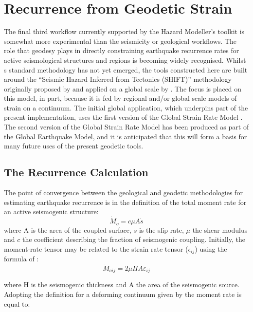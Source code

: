 \section{Recurrence from Geodetic Strain}

The final third workflow currently supported by the Hazard Modeller's toolkit is somewhat more experimental than the seismicity or geological workflows. The role that geodesy plays in directly constraining earthquake recurrence rates for active seismological structures and regions is becoming widely recognised. Whilst s standard methodology has not yet emerged, the tools constructed here are built around the ``Seismic Hazard Inferred from Tectonics (SHIFT)'' methodology originally proposed by \textcite{BirdLiu2007} and applied on a global scale by \textcite{Bird_etal2010}. The focus is placed on this model, in part, because it is fed by regional and/or global scale models of strain on a continuum. The initial global application, which underpins part of the present implementation, uses the first version of the Global Strain Rate Model \parencite{Kreemer_etal2003}. The second version of the Global Strain Rate Model has been produced as part of the Global Earthquake Model, and it is anticipated that this will form a basis for many future uses of the present geodetic tools.

\subsection{The Recurrence Calculation}

The point of convergence between the geological and geodetic methodologies for estimating earthquake recurrence is in the definition of the total moment rate for an active seismogenic structure:
 \begin{equation}
 \dot{M}_o = c \mu A \dot{s}
 \end{equation}
 where A is the area of the coupled surface, $\dot{s}$ is the slip rate, $\mu$ the shear modulus and $c$ the coefficient describing the fraction of seismogenic coupling. Initially, the moment-rate tensor may be related to the strain rate tensor ($\epsilon_{ij}$) using the formula of \textcite{Kostrov1974}:
 \begin{equation}
 \dot{M}_{oij} = 2 \mu H A \varepsilon_{ij}
 \end{equation}
 
 where H is the seismogenic thickness and A the area of the seismogenic source. Adopting the definition for a deforming continuum given by \textcite{BirdLiu2007} the moment rate is equal to:
 
